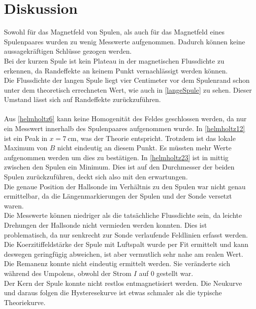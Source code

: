 \section{Diskussion}
\label{sec:Diskussion}

Sowohl für das Magnetfeld von Spulen, als auch für das Magnetfeld eines Spulenpaares wurden zu wenig Messwerte aufgenommen.
Dadurch können keine aussagekräftigen Schlüsse gezogen werden.\\
Bei der kurzen Spule ist kein Plateau in der magnetischen Flussdichte zu erkennen, da Randeffekte an keinem
Punkt vernachlässigt werden können. \\
Die Flussdichte der langen Spule liegt vier Centimeter vor dem Spulenrand schon unter dem theoretisch errechneten Wert, wie auch in
\autoref{langeSpule} zu sehen. Dieser Umstand lässt sich auf Randeffekte zurückzuführen.\\
\\
Aus \autoref{helmholtz6} kann keine Homogenität des Feldes geschlossen werden, da nur ein Messwert innerhalb des
Spulenpaares aufgenommen wurde. In \autoref{helmholtz12} ist ein Peak in $x = \SI{7}{\centi\meter}$, was der Theorie entspricht.
Trotzdem ist das lokale Maximum von $B$ nicht eindeutig an diesem Punkt. Es müssten mehr Werte aufgenommen werden um dies zu bestätigen.
In \autoref{helmholtz23} ist in mittig zwischen den Spulen ein Minimum. Dies ist auf den Durchmesser der beiden Spulen 
zurückzuführen, deckt sich also mit den erwartungen.\\
Die genaue Position der Hallsonde im Verhältnis zu den Spulen war nicht genau ermittelbar, da die Längenmarkierungen der Spulen und der Sonde
versetzt waren.\\
Die Messwerte können niedriger als die tatsächliche Flussdichte sein, da leichte Drehungen der Hallsonde nicht vermieden werden konnten.
Dies ist problematisch, da nur senkrecht zur Sonde verlaufende Feldlinien erfasst werden.
\\
Die Koerzitiffeldstärke der Spule mit Luftspalt wurde per Fit ermittelt und kann deswegen geringfügig abweichen, ist aber 
vermutlich sehr nahe am realen Wert.\\
Die Remanenz konnte nicht eindeutig ermittelt werden. Sie veränderte sich während des Umpolens, obwohl der Strom $I$ auf 0 gestellt war.\\
Der Kern der Spule konnte nicht restlos entmagnetisiert werden. Die Neukurve und daraus folgen die Hysteresekurve ist etwas schmaler als die typische Theoriekurve.\\



\newpage